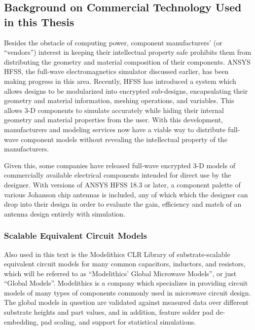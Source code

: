 \documentclass[12pt]{usfcoe}
\begin{document}
    

    \subsection{Background on Commercial Technology Used in this Thesis}

    Besides the obstacle of computing power, component manufacturers' (or ``vendors'') interest in keeping their intellectual property safe prohibits them from distributing the geometry and material composition of their components. 
    ANSYS HFSS, the full-wave electromagnetics simulator discussed earlier, has been making progress in this area.
    Recently, HFSS has introduced a system which allows designs to be modularized into encrypted sub-designs, encapsulating their geometry and material information, meshing operations, and variables. 
    This allows 3-D components to simulate accurately while hiding their internal geometry and material properties from the user.  
    With this development, manufacturers and modeling services now have a viable way to distribute full-wave component models without revealing the intellectual property of the manufacturers.  
    
    Given this, some companies %
    have  released full-wave encrypted 3-D models of commercially available electrical components intended for direct use by the designer.  
    With versions of ANSYS HFSS 18.3 or later, a component palette of various Johanson chip antennas is included, any of which which the designer can drop into their design in order to evaluate the gain, efficiency and match of an antenna design entirely with simulation.  
    \subsubsection{Scalable Equivalent Circuit Models}
    Also used in this text is the Modelithics CLR Library of substrate-scalable equivalent circuit models for many common capacitors, inductors, and resistors, which will be referred to as ``Modelithics' Global Microwave  Models'', or just ``Global Models''. Modelithics is a company which specializes in providing circuit models of many types of components commonly used in microwave circuit design.
    The global models in question are validated against measured data over different substrate heights and part values, and in addition, feature solder pad de-embedding, pad scaling, and support for statistical simulations.
    
\end{document}
